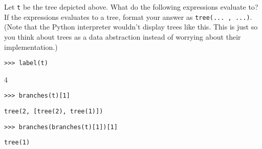 \begin{blocksection}
\question Let \texttt{t} be the tree depicted above. What do the following expressions evaluate to?
If the expressions evaluates to a tree, format your answer as
\lstinline{tree(... , ...)}. 
(Note that the Python interpreter wouldn't display trees like this. This is just so you think about trees as a data abstraction instead of worrying about their implementation.)

\begin{lstlisting}
>>> label(t)
\end{lstlisting}
\begin{solution}[.25in]
4
\end{solution}

\begin{lstlisting}
>>> branches(t)[1]
\end{lstlisting}
\begin{solution}[.25in]
\begin{lstlisting}
tree(2, [tree(2), tree(1)])
\end{lstlisting}
\end{solution}

\begin{lstlisting}
>>> branches(branches(t)[1])[1]
\end{lstlisting}
\begin{solution}[.25in]
\begin{lstlisting}
tree(1)
\end{lstlisting}
\end{solution}
\end{blocksection}
